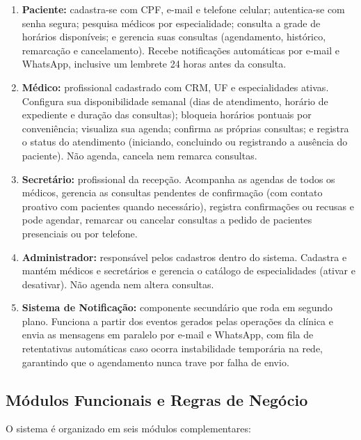 \documentclass[12pt,a4paper]{article}
\providecommand{\tightlist}{%
  \setlength{\itemsep}{0pt}\setlength{\parskip}{0pt}}
\begin{document}
\begin{enumerate}
\tightlist
\item
  \textbf{Paciente:} cadastra-se com CPF, e-mail e telefone celular;
  autentica-se com senha segura; pesquisa médicos por especialidade;
  consulta a grade de horários disponíveis; e gerencia suas consultas
  (agendamento, histórico, remarcação e cancelamento). Recebe
  notificações automáticas por e-mail e WhatsApp, inclusive um lembrete
  24 horas antes da consulta.
\item
  \textbf{Médico:} profissional cadastrado com CRM, UF e especialidades
  ativas. Configura sua disponibilidade semanal (dias de atendimento,
  horário de expediente e duração das consultas); bloqueia horários
  pontuais por conveniência; visualiza sua agenda; confirma as próprias
  consultas; e registra o status do atendimento (iniciando, concluindo
  ou registrando a ausência do paciente). Não agenda, cancela nem
  remarca consultas.
\item
  \textbf{Secretário:} profissional da recepção. Acompanha as agendas de
  todos os médicos, gerencia as consultas pendentes de confirmação (com
  contato proativo com pacientes quando necessário), registra
  confirmações ou recusas e pode agendar, remarcar ou cancelar consultas
  a pedido de pacientes presenciais ou por telefone.
\item
  \textbf{Administrador:} responsável pelos cadastros dentro do sistema.
  Cadastra e mantém médicos e secretários e gerencia o catálogo de
  especialidades (ativar e desativar). Não agenda nem altera consultas.
\item
  \textbf{Sistema de Notificação:} componente secundário que roda em
  segundo plano. Funciona a partir dos eventos gerados pelas operações
  da clínica e envia as mensagens em paralelo por e-mail e WhatsApp, com
  fila de retentativas automáticas caso ocorra instabilidade temporária
  na rede, garantindo que o agendamento nunca trave por falha de envio.
\end{enumerate}

\subsection{Módulos Funcionais e Regras de Negócio}\label{sec:modulos-regras}

O sistema é organizado em seis módulos complementares:
\end{document}
